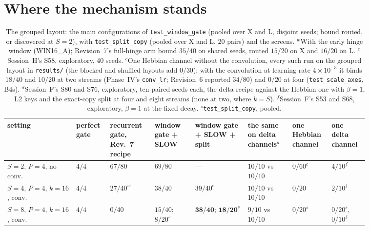 \documentclass[11pt]{article}
\newcommand{\arm}[1]{\textsf{#1}}
\begin{document}
\section{Where the mechanism stands}
\label{sec:synthesis}

\begin{table}[H]
\centering
\footnotesize
\setlength{\tabcolsep}{2.5pt}
\begin{tabular}{@{}>{\raggedright\arraybackslash}p{0.17\linewidth}>{\centering\arraybackslash}p{0.07\linewidth}>{\centering\arraybackslash}p{0.11\linewidth}>{\centering\arraybackslash}p{0.1\linewidth}>{\centering\arraybackslash}p{0.13\linewidth}>{\centering\arraybackslash}p{0.11\linewidth}>{\centering\arraybackslash}p{0.08\linewidth}>{\centering\arraybackslash}p{0.09\linewidth}@{}}
\toprule
setting & perfect gate & recurrent gate, Rev.~7 recipe & window gate + SLOW & window gate + SLOW + split & the same on delta channels$^{d}$ & one Hebbian channel & one delta channel\\
\midrule
$S{=}2$, $P{=}4$, no conv. & $4/4$ & $67/80$ & $69/80$ & --- & $10/10$ vs $10/10$ & $0/60^{c}$ & $4/10^{f}$\\
$S{=}4$, $P{=}4$, $k{=}16$, conv. & $4/4$ & $27/40^{w}$ & $38/40$ & $39/40^{e}$ & $10/10$ vs $10/10$ & $0/20$ & $2/10^{f}$\\
$S{=}8$, $P{=}4$, $k{=}16$, conv. & $4/4$ & $0/40$ & $15/40$; $8/20^{s}$ & $\mathbf{38/40}$; $\mathbf{18/20}^{s}$ & $9/10$ vs $10/10$ & $0/20^{s}$ & $0/20^{s}$, $0/10^{f}$\\
\bottomrule
\end{tabular}
\caption{The grouped layout: the main configurations of \texttt{test\_window\_gate} (pooled over X and L, disjoint seeds; bound routed, or discovered at $S = 2$), with \texttt{test\_split\_copy} (pooled over X and L, 20 pairs) and the screens. $^{w}$With the early hinge window (\arm{WIN16\_A}); Revision~7's full-hinge arm bound $35/40$ on shared seeds, routed $15/20$ on X and $16/20$ on L. $^{e}$Session~H's S58, exploratory, 40 seeds. $^{c}$One Hebbian channel without the convolution, every such run on the grouped layout in \texttt{results/} (the blocked and shuffled layouts add $0/30$); with the convolution at learning rate $4\times10^{-3}$ it binds $18/40$ and $10/20$ at two streams (Phase~IV's \texttt{conv\_lr}; Revision~6 reported $34/80$) and $0/20$ at four (\texttt{test\_scale\_axes}, B4s). $^{d}$Session~F's S80 and S76, exploratory, ten paired seeds each, the delta recipe against the Hebbian one with $\beta = 1$, L2 keys and the exact-copy split at four and eight streams (none at two, where $k = S$). $^{f}$Session~F's S53 and S68, exploratory, $\beta = 1$ at the fixed decay. $^{s}$\texttt{test\_split\_copy}, pooled.}
\label{tab:synthesis}
\end{table}
\end{document}
